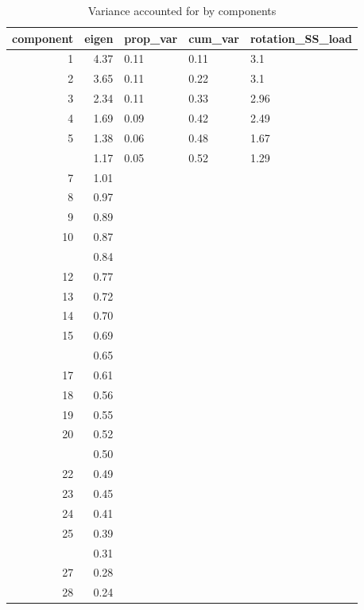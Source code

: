 \documentclass[]{article}
\begin{document}
\begin{table}[H]

\caption{\label{tab:unnamed-chunk-6}Variance accounted for by components}
\centering
\fontsize{6}{8}\selectfont
\begin{tabular}[t]{rrlll}
\toprule
component & eigen & prop\_var & cum\_var & rotation\_SS\_load\\
\midrule
1 & 4.37 & 0.11 & 0.11 & 3.1\\
2 & 3.65 & 0.11 & 0.22 & 3.1\\
3 & 2.34 & 0.11 & 0.33 & 2.96\\
4 & 1.69 & 0.09 & 0.42 & 2.49\\
5 & 1.38 & 0.06 & 0.48 & 1.67\\
\addlinespace
6 & 1.17 & 0.05 & 0.52 & 1.29\\
7 & 1.01 &  &  & \\
8 & 0.97 &  &  & \\
9 & 0.89 &  &  & \\
10 & 0.87 &  &  & \\
\addlinespace
11 & 0.84 &  &  & \\
12 & 0.77 &  &  & \\
13 & 0.72 &  &  & \\
14 & 0.70 &  &  & \\
15 & 0.69 &  &  & \\
\addlinespace
16 & 0.65 &  &  & \\
17 & 0.61 &  &  & \\
18 & 0.56 &  &  & \\
19 & 0.55 &  &  & \\
20 & 0.52 &  &  & \\
\addlinespace
21 & 0.50 &  &  & \\
22 & 0.49 &  &  & \\
23 & 0.45 &  &  & \\
24 & 0.41 &  &  & \\
25 & 0.39 &  &  & \\
\addlinespace
26 & 0.31 &  &  & \\
27 & 0.28 &  &  & \\
28 & 0.24 &  &  & \\
\bottomrule
\end{tabular}
\end{table}
\end{document}
